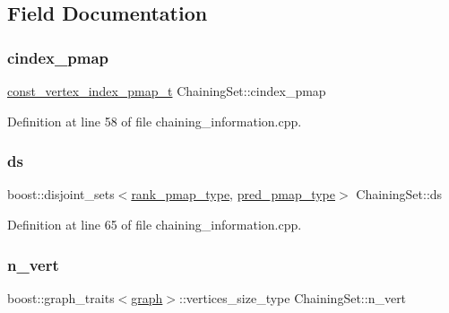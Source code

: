 \subsection{Field Documentation}
\mbox{\label{structChainingSet_ad9d5ca88a6b3604cb70a5dabaca0753b}} 
\subsubsection{\texorpdfstring{cindex\+\_\+pmap}{cindex\_pmap}}
{\footnotesize\ttfamily \hyperlink{structChainingSet_a770d83c8828c7b38df1925810bf31e31}{const\+\_\+vertex\+\_\+index\+\_\+pmap\+\_\+t} Chaining\+Set\+::cindex\+\_\+pmap}



Definition at line 58 of file chaining\+\_\+information.\+cpp.

\mbox{\label{structChainingSet_a260da22773fe71860ce535dfb3ebde4e}} 
\subsubsection{\texorpdfstring{ds}{ds}}
{\footnotesize\ttfamily boost\+::disjoint\+\_\+sets$<$\hyperlink{structChainingSet_aebbcd031d5f20a8ff678fff4688c9d77}{rank\+\_\+pmap\+\_\+type}, \hyperlink{structChainingSet_a0c0db2b75967dbe93b78cd1f4751c780}{pred\+\_\+pmap\+\_\+type}$>$ Chaining\+Set\+::ds}



Definition at line 65 of file chaining\+\_\+information.\+cpp.

\mbox{\label{structChainingSet_aa8400c42fcea8f0f3dbc88d46d56b74e}} 
\subsubsection{\texorpdfstring{n\+\_\+vert}{n\_vert}}
{\footnotesize\ttfamily boost\+::graph\+\_\+traits$<$\hyperlink{structgraph}{graph}$>$\+::vertices\+\_\+size\+\_\+type Chaining\+Set\+::n\+\_\+vert}



